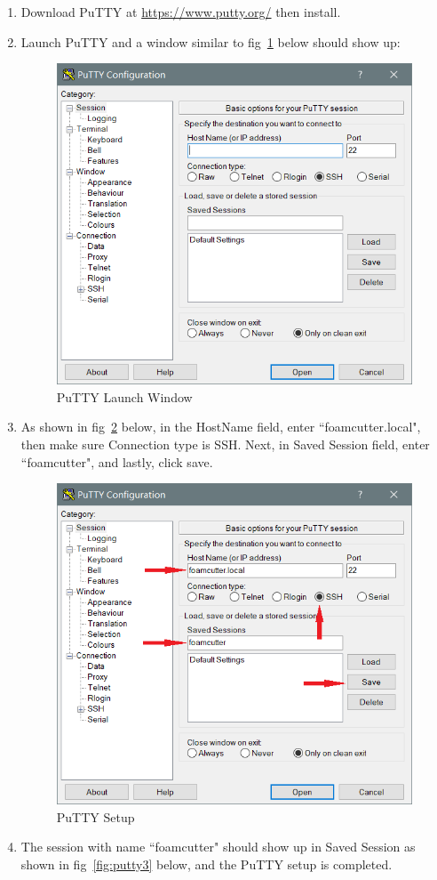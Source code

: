 \documentclass[titlepage,10pt,letter]{report}
\numberwithin{equation}{chapter}
\begin{document}
\begin{enumerate}[noitemsep,topsep=0pt]
	\item Download PuTTY at \href{https://www.putty.org/}{https://www.putty.org/} then install.
	\item Launch PuTTY and a window similar to fig~\ref{fig:putty1} below should show up:
	\begin{figure} [H]
		\includegraphics[width = 0.6\linewidth]{./Figures/Laptop_Setup/putty1.png}
		\caption{PuTTY Launch Window}
		\label{fig:putty1}
	\end{figure}
	\item As shown in fig~\ref{fig:putty2} below, in the HostName field, enter ``foamcutter.local", then make sure Connection type is SSH. Next, in Saved Session field, enter ``foamcutter", and lastly, click save.
	\begin{figure} [H]
		\includegraphics[width = 0.6\linewidth]{./Figures/Laptop_Setup/putty2.png}
		\caption{PuTTY Setup}
		\label{fig:putty2}
	\end{figure}
	\item The session with name ``foamcutter" should show up in Saved Session as shown in fig~\ref{fig:putty3} below, and the PuTTY setup is completed.

\end{enumerate}
\end{document}
